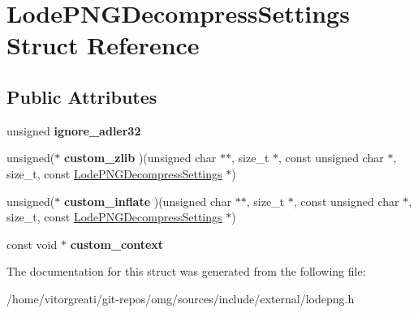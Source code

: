 \hypertarget{struct_lode_p_n_g_decompress_settings}{}\section{Lode\+P\+N\+G\+Decompress\+Settings Struct Reference}
\label{struct_lode_p_n_g_decompress_settings}
\subsection*{Public Attributes}
\begin{DoxyCompactItemize}
\item 
\mbox{\label{struct_lode_p_n_g_decompress_settings_afab4b919650b51b4d2f175a60ed6c580}} 
unsigned {\bfseries ignore\+\_\+adler32}
\item 
\mbox{\label{struct_lode_p_n_g_decompress_settings_a9dd432e46330dbd2ce3ef1929c64337d}} 
unsigned($\ast$ {\bfseries custom\+\_\+zlib} )(unsigned char $\ast$$\ast$, size\+\_\+t $\ast$, const unsigned char $\ast$, size\+\_\+t, const \mbox{\hyperlink{struct_lode_p_n_g_decompress_settings}{Lode\+P\+N\+G\+Decompress\+Settings}} $\ast$)
\item 
\mbox{\label{struct_lode_p_n_g_decompress_settings_a023aa5946c99934d40280850a4d8b204}} 
unsigned($\ast$ {\bfseries custom\+\_\+inflate} )(unsigned char $\ast$$\ast$, size\+\_\+t $\ast$, const unsigned char $\ast$, size\+\_\+t, const \mbox{\hyperlink{struct_lode_p_n_g_decompress_settings}{Lode\+P\+N\+G\+Decompress\+Settings}} $\ast$)
\item 
\mbox{\label{struct_lode_p_n_g_decompress_settings_a66e3608b541c64bb275c0ac1a80c3ec6}} 
const void $\ast$ {\bfseries custom\+\_\+context}
\end{DoxyCompactItemize}


The documentation for this struct was generated from the following file\+:\begin{DoxyCompactItemize}
\item 
/home/vitorgreati/git-\/repos/omg/sources/include/external/lodepng.\+h\end{DoxyCompactItemize}
